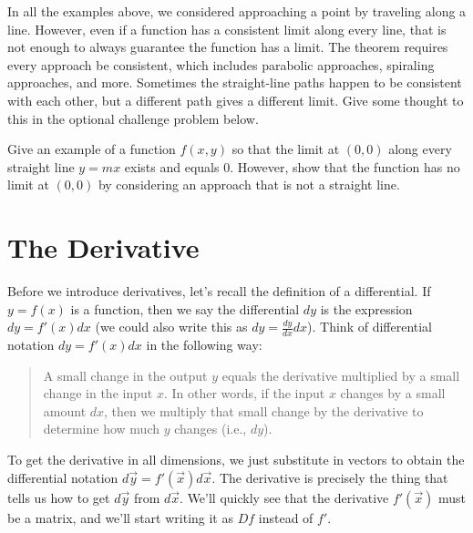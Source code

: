 In all the examples above, we considered approaching a point by traveling along a line.  However, even if a function has a consistent limit along every line, that is not enough to always guarantee the function has a limit.  The theorem requires every approach be consistent, which includes parabolic approaches, spiraling approaches, and more.  Sometimes the straight-line paths happen to be consistent with each other, but a different path gives a different limit.  Give some thought to this in the optional challenge problem below.

\begin{problem*}[Challenge]
 Give an example of a function $f(x,y)$ so that the limit at $(0,0)$ along every straight line $y=mx$ exists and equals 0.  However, show that the function has no limit at $(0,0)$ by considering an approach that is not a straight line.
\end{problem*}



\section{The Derivative}

Before we introduce derivatives, let's recall the definition of a differential.  If $y=f(x)$ is a function, then we say the differential $dy$ is the expression $dy=f'(x) dx$ (we could also write this as $dy = \frac{dy}{dx}dx$). Think of differential notation $dy=f'(x)dx$ in the following way: 
\begin{quote}
A small change in the output $y$ equals the derivative multiplied by a small change in the input $x$.  In other words, if the input $x$ changes by a small amount $dx$, then we multiply that small change by the derivative to determine how much $y$ changes (i.e., $dy$).
\end{quote}
To get the derivative in all dimensions, we just substitute in vectors to obtain the differential notation $d\vec y = f'(\vec x) d\vec x$. The derivative is precisely the thing that tells us how to get $d\vec y$ from $d\vec x$.  We'll quickly see that the derivative $f'(\vec x)$ must be a matrix, and we'll start writing it as $Df$ instead of $f'$.

